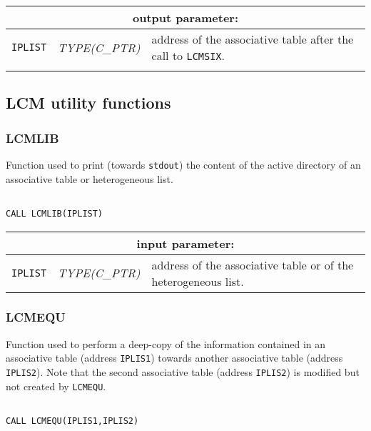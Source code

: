 \vskip 0.8cm

\noindent
\begin{tabular}{|p{1.5cm}|p{3cm}|p{10cm}|}
\hline
\multicolumn{3}{|c|}{\bf output parameter:} \\
\hline
{\tt IPLIST} & {\it TYPE(C\_PTR)} & address of the associative table after the call to {\tt LCMSIX}. \\
\hline
\\
\end{tabular}

\vspace{0.8cm}

\subsection{LCM utility functions}

\subsubsection{LCMLIB}

Function used to print (towards {\tt stdout}) the content of the active directory of an associative table or heterogeneous list.

\begin{verbatim}

CALL LCMLIB(IPLIST)
\end{verbatim}

\noindent
\begin{tabular}{|p{1.5cm}|p{3cm}|p{10cm}|}
\hline
\multicolumn{3}{|c|}{\bf input parameter:} \\
\hline
{\tt IPLIST} & {\it TYPE(C\_PTR)} & address of the associative table or of the heterogeneous list. \\
\hline
\end{tabular}

\subsubsection{LCMEQU}

Function used to perform a deep-copy of the information contained in an associative table (address {\tt IPLIS1}) 
towards another associative table (address {\tt IPLIS2}). Note that the second associative table (address {\tt IPLIS2}) is modified
but not created by {\tt LCMEQU}.

\begin{verbatim}

CALL LCMEQU(IPLIS1,IPLIS2)
\end{verbatim}

